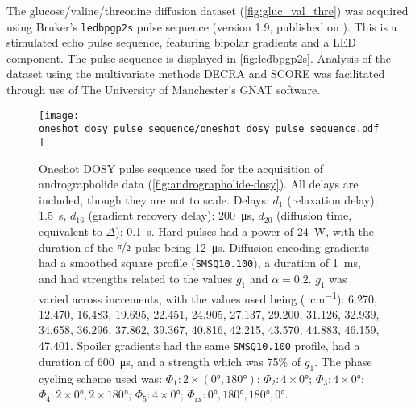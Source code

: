

The glucose/valine/threonine diffusion dataset (\cref{fig:gluc_val_thre})
was acquired using Bruker's \texttt{ledbpgp2s} pulse sequence (version 1.9, published on
). This is a stimulated echo pulse sequence, featuring
bipolar gradients and a \ac{LED} component\cite{Wu1995}. The pulse sequence is
displayed in \cref{fig:ledbpgp2s}.
Analysis of the dataset using the multivariate methods \ac{DECRA} and
\ac{SCORE} was facilitated through use of The University of Manchester's
\ac{GNAT} software\cite{Castanar2018}.

\begin{figure}[H]
    \centering
    \texttt{[image: oneshot\_dosy\_pulse\_sequence/oneshot\_dosy\_pulse\_sequence.pdf]}
    \caption[
        Oneshot \acs{DOSY} pulse sequence used for the acquisition of
        andrographolide data.
    ]{
        Oneshot \ac{DOSY} pulse sequence used for the acquisition of
        andrographolide data (\cref{fig:andrographolide-dosy}). All
        delays are included, though they are not to scale.
        Delays:
        $d_1$ (relaxation delay): \qty{1.5}{\second},
        $d_{16}$ (gradient recovery delay): \qty{200}{\micro\second},
        $d_{20}$ (diffusion time, equivalent to $\Delta$): \qty{0.1}{\second}.
        Hard pulses had a power of \qty{24}{\watt},
        with the duration of the $\nicefrac{\pi}{2}$ pulse being
        \qty{12}{\micro\second}.
        Diffusion encoding gradients had a smoothed square profile
        (\texttt{SMSQ10.100}), a duration of \qty{1}{\milli\second}, and had
        strengths related to the values $g_1$ and $\alpha = 0.2$.
        $g_1$ was varied across increments, with the values used
        being (\unit{\gauss \per \centi \meter}):
        6.270,
        12.470,
        16.483,
        19.695,
        22.451,
        24.905,
        27.137,
        29.200,
        31.126,
        32.939,
        34.658,
        36.296,
        37.862,
        39.367,
        40.816,
        42.215,
        43.570,
        44.883,
        46.159,
        47.401.
        Spoiler gradients had the same \texttt{SMSQ10.100} profile, had a
        duration of \qty{600}{\micro\second}, and a strength which was 75\% of
        $g_1$.
        The phase cycling scheme used was:
        $\Phi_1: 2 \times (\ang{0}, \ang{180})$;
        $\Phi_2: 4 \times \ang{0}$;
        $\Phi_3: 4 \times \ang{0}$;
        $\Phi_4: 2 \times \ang{0}, 2 \times \ang{180}$;
        $\Phi_5: 4 \times \ang{0}$;
        $\Phi_{\text{rx}}: \ang{0}, \ang{180}, \ang{180}, \ang{0}$.
    }
    \label{fig:oneshot-dosy}
\end{figure}

